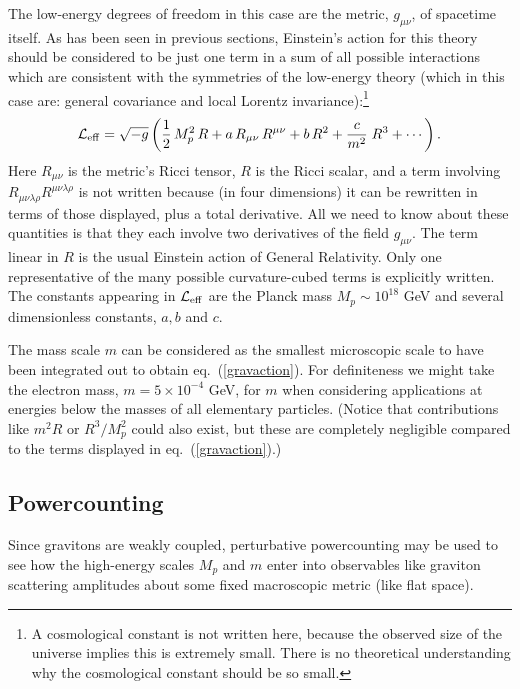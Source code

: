 \documentclass[12pt]{article}
\def\pref#1{(\ref{#1})}
\def\hf{\frac12}
\begin{document}
The low-energy degrees of freedom in this case are the
metric, $g_{\mu\nu}$, of spacetime itself. As has been seen
in previous sections, Einstein's action for this theory should 
be considered to be just one term in a sum of all possible 
interactions which are consistent with the symmetries of
the low-energy theory (which in this case are:
general covariance and local Lorentz invariance):\footnote{A
cosmological constant is not written here, because the observed
size of the universe implies this is extremely small. There is no
theoretical understanding why the cosmological constant should
be so small.}
%
\begin{equation}
\label{gravaction}
{\cal L}_{\rm eff} = \sqrt{- g} \left( \hf \, M_p^2 \, R
+ a \, R_{\mu\nu} \, R^{\mu\nu} + b \, R^2 + {c \over m^2} \; R^3
+ \cdots \right) .
\end{equation}
%
Here $R_{\mu\nu}$ is the metric's Ricci tensor, $R$ is the
Ricci scalar, and a term involving $R_{\mu\nu\lambda\rho}
R^{\mu\nu\lambda\rho}$ is not written because (in four
dimensions) it can be rewritten in terms of those displayed,
plus a total derivative. All we need to know about these 
quantities is that they each involve two derivatives 
of the field $g_{\mu\nu}$. The term linear in $R$ is the usual
Einstein action of General Relativity.
Only one representative of the many
possible curvature-cubed terms is explicitly written. 
The constants appearing in ${\cal L}_{\rm eff}$
are the Planck mass $M_p \sim 10^{18}$ GeV and
several dimensionless constants, $a,b$ and $c$.

The mass scale $m$ can be considered as the
smallest microscopic scale to have been integrated out to obtain
eq.~\pref{gravaction}. For definiteness we might take
the electron mass, $m = 5\times 10^{-4}$ GeV, for $m$ when
considering applications at energies below the masses of
all elementary particles. (Notice that contributions like
$m^2 R$ or $R^3/M_p^2$ could also exist,
but these are completely negligible compared to the
terms displayed in eq.~\pref{gravaction}.)

\subsection{Powercounting}

Since gravitons are weakly coupled, perturbative powercounting
may be used to see how the high-energy scales $M_p$ and $m$
enter into observables like graviton scattering amplitudes about
some fixed macroscopic metric (like flat space). 
\end{document}
